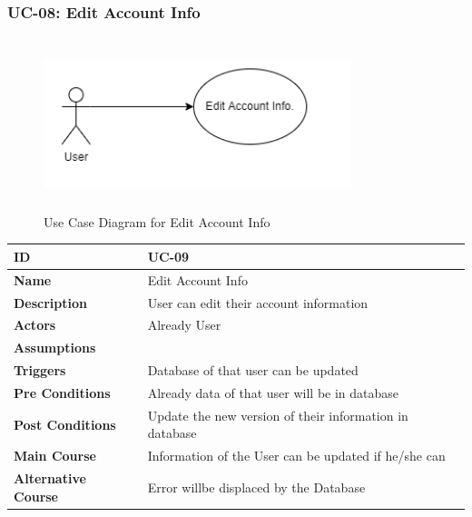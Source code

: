     \subsubsection{UC-08: Edit Account Info}
    \begin{figure}[H]
        \includegraphics[height=5cm, width=0.8\textwidth]{./diagrams/Use Case/u8.png}
        \centering 
        \caption{Use Case Diagram for Edit Account Info}
        \label{fig:Usecase1}
        \end{figure}
        
    \begin{center}
        \begin{tabularx}{\textwidth}{|l|X|}
            \hline
            \textbf{ID} & UC-09 \\
            \hline
            \textbf{Name} & Edit Account Info \\
            \hline
            \textbf{Description} & User can edit their account information \\
            \hline
            \textbf{Actors} & Already User \\
            \hline
            \textbf{Assumptions} &  \\
            \hline
            \textbf{Triggers} & Database of that user can be updated \\
            \hline
            \textbf{Pre Conditions} & Already data of that user will be in database  \\
            \hline
            \textbf{Post Conditions} & Update the new version of their information in database \\
            \hline
            \textbf{Main Course} & Information of the User can be updated if he/she can \\
            \hline
            \textbf{Alternative Course} & Error willbe displaced by the Database \\
            \hline
            
        \end{tabularx}
    \end{center}
    \newpage 
    

